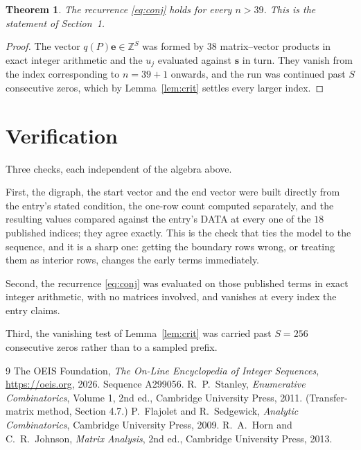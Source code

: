 \documentclass[11pt,a4paper]{article}
\theoremstyle{plain}
\newtheorem{theorem}{Theorem}
\theoremstyle{definition}
\begin{document}
\begin{theorem}
The recurrence \eqref{eq:conj} holds for every $n>39$. This is the statement of
Section~1.
\end{theorem}

\begin{proof}
The vector $q(P)\mathbf{e}\in\mathbb{Z}^{S}$ was formed by $38$ matrix--vector
products in exact integer arithmetic and the $u_j$ evaluated against $\mathbf{s}$ in turn.
They vanish from the index corresponding to $n=39+1$ onwards, and the run was continued
past $S$ consecutive zeros, which by Lemma~\ref{lem:crit} settles every larger index.
\end{proof}

\section{Verification}

Three checks, each independent of the algebra above.

First, the digraph, the start vector and the end vector were built directly from the
entry's stated condition, the one-row count computed separately, and the resulting values
compared against the entry's DATA at every one of the $18$ published indices; they
agree exactly. This is the check that ties the model to the sequence, and it is a sharp one:
getting the boundary rows wrong, or treating them as interior rows, changes the early terms
immediately.

Second, the recurrence \eqref{eq:conj} was evaluated on those published terms in exact
integer arithmetic, with no matrices involved, and vanishes at every index the entry claims.

Third, the vanishing test of Lemma~\ref{lem:crit} was carried past $S=256$ consecutive
zeros rather than to a sampled prefix.

\begin{thebibliography}{9}
 The OEIS Foundation, \emph{The On-Line Encyclopedia of Integer
Sequences}, \url{https://oeis.org}, 2026. Sequence A299056.
 R.~P.~Stanley, \emph{Enumerative Combinatorics}, Volume 1, 2nd ed.,
Cambridge University Press, 2011. (Transfer-matrix method, Section 4.7.)
 P.~Flajolet and R.~Sedgewick, \emph{Analytic Combinatorics}, Cambridge
University Press, 2009.
 R.~A.~Horn and C.~R.~Johnson, \emph{Matrix Analysis}, 2nd ed., Cambridge
University Press, 2013.
\end{thebibliography}
\end{document}
